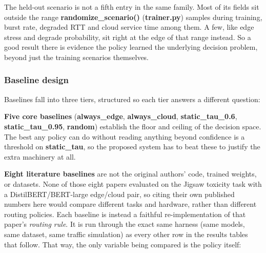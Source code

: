 The held-out scenario is not a fifth entry in the same family. Most of
its fields sit outside the range \textbf{randomize\_scenario()}
(\textbf{trainer.py}) samples during training, burst rate, degraded
RTT and cloud service time among them. A few, like edge stress and
degrade probability, sit right at the edge of that range instead. So
a good result there is evidence the policy learned the underlying
decision problem, beyond just the training scenarios themselves.

\hypertarget{baseline-design}{%
\subsubsection{Baseline design}\label{baseline-design}}

Baselines fall into three tiers, structured so each tier
answers a different question:

\textbf{Five core baselines} (\textbf{always\_edge},
\textbf{always\_cloud}, \textbf{static\_tau\_0.6},
\textbf{static\_tau\_0.95}, \textbf{random}) establish the floor and
ceiling of the decision space. The best any policy can do without
reading anything beyond confidence is a threshold on
\textbf{static\_tau}, so the proposed system has to beat these to
justify the extra machinery at all.

\textbf{Eight literature baselines} are not the original authors' code,
trained weights, or datasets. None of those eight papers evaluated on
the Jigsaw toxicity task with a DistilBERT/BERT-large edge/cloud pair,
so citing their own published numbers here would compare different tasks
and hardware, rather than different routing policies. Each baseline is
instead a faithful re-implementation of that paper's \emph{routing rule}. It is run
through the exact same harness (same models, same dataset, same
traffic simulation) as every other row in the results tables that
follow. That way, the only variable being compared is the policy
itself:

